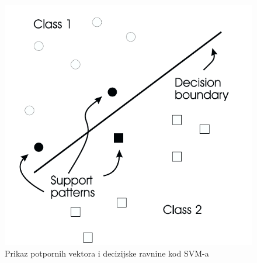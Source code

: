 \documentclass[times, utf8, diplomski]{fer}
\theoremstyle{definition}
\begin{document}
\begin{figure}[h]
\centering
\includegraphics[scale=0.5]{omc_hyperplane.png}
\caption{Prikaz potpornih vektora i decizijske ravnine kod SVM-a}
\end{figure}
\end{document}

